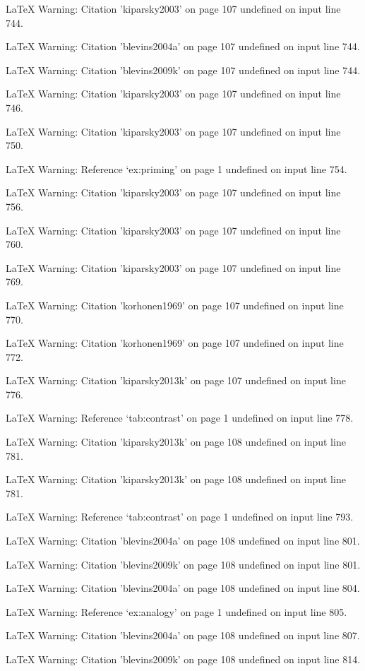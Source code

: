 LaTeX Warning: Citation 'kiparsky2003' on page 107 undefined on input line 744.


LaTeX Warning: Citation 'blevins2004a' on page 107 undefined on input line 744.


LaTeX Warning: Citation 'blevins2009k' on page 107 undefined on input line 744.


LaTeX Warning: Citation 'kiparsky2003' on page 107 undefined on input line 746.


LaTeX Warning: Citation 'kiparsky2003' on page 107 undefined on input line 750.


LaTeX Warning: Reference `ex:priming' on page 1 undefined on input line 754.


LaTeX Warning: Citation 'kiparsky2003' on page 107 undefined on input line 756.


LaTeX Warning: Citation 'kiparsky2003' on page 107 undefined on input line 760.


LaTeX Warning: Citation 'kiparsky2003' on page 107 undefined on input line 769.


LaTeX Warning: Citation 'korhonen1969' on page 107 undefined on input line 770.


LaTeX Warning: Citation 'korhonen1969' on page 107 undefined on input line 772.


LaTeX Warning: Citation 'kiparsky2013k' on page 107 undefined on input line 776.


LaTeX Warning: Reference `tab:contrast' on page 1 undefined on input line 778.


LaTeX Warning: Citation 'kiparsky2013k' on page 108 undefined on input line 781.


LaTeX Warning: Citation 'kiparsky2013k' on page 108 undefined on input line 781.


LaTeX Warning: Reference `tab:contrast' on page 1 undefined on input line 793.


LaTeX Warning: Citation 'blevins2004a' on page 108 undefined on input line 801.


LaTeX Warning: Citation 'blevins2009k' on page 108 undefined on input line 801.


LaTeX Warning: Citation 'blevins2004a' on page 108 undefined on input line 804.


LaTeX Warning: Reference `ex:analogy' on page 1 undefined on input line 805.


LaTeX Warning: Citation 'blevins2004a' on page 108 undefined on input line 807.


LaTeX Warning: Citation 'blevins2009k' on page 108 undefined on input line 814.


